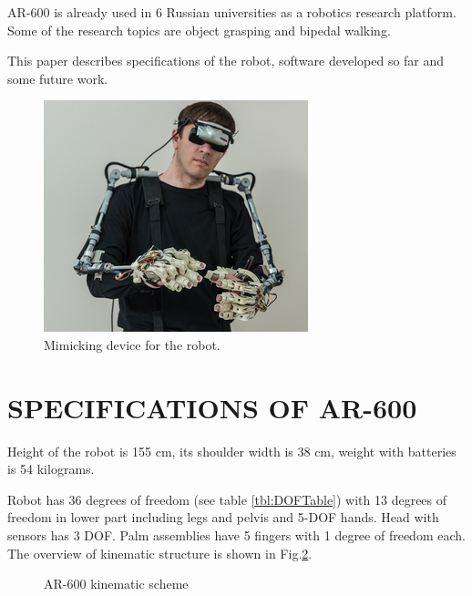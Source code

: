 \documentclass[letterpaper, 10 pt, conference]{ieeeconf}  %
\begin{document}
AR-600 is already used in 6 Russian universities as a robotics research
platform. Some of the research topics are object grasping and bipedal walking.

This paper describes specifications of the robot, software developed so far and
some future work.

\begin{figure} [thpb]
      \centering
      
      \includegraphics[scale=0.8]{suit}
      \caption{Mimicking device for the robot.}
      \label{img:suit}
\end{figure}

\section{SPECIFICATIONS OF AR-600}

Height of the robot is 155 cm, its shoulder width is 38 cm, weight with
batteries is 54 kilograms.

Robot has 36 degrees of freedom (see table \ref{tbl:DOFTable}) with 13 degrees
of freedom in lower part including legs and pelvis and 5-DOF hands. Head with sensors has 3 DOF. Palm assemblies have 5
fingers with 1 degree of freedom each.
The overview of kinematic structure is shown in Fig.\ref{img:kinematic}.

 \begin{figure}[thpb]
      \centering
      \caption{AR-600 kinematic scheme}
      \label{img:kinematic}
   \end{figure}
 
\end{document}
